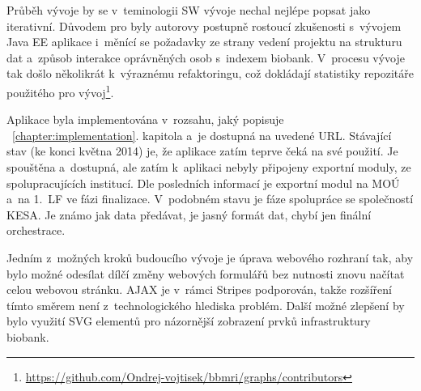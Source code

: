 \documentclass[11pt, draft, oneside]{fithesis2}
\begin{document}
Průběh vývoje by se v~teminologii SW vývoje nechal nejlépe popsat jako iterativní. Důvodem pro  byly autorovy postupně rostoucí zkušenosti s~vývojem Java EE aplikace i~měnící se požadavky ze strany vedení projektu na strukturu dat a~způsob interakce oprávněných osob s~indexem biobank. V~procesu vývoje tak došlo několikrát k~výraznému refaktoringu, což dokládají statistiky repozitáře použitého pro vývoj\footnote{\url{https://github.com/Ondrej-vojtisek/bbmri/graphs/contributors}}.

Aplikace byla implementována v~rozsahu, jaký popisuje ~\ref{chapter:implementation}. kapitola a~je dostupná na uvedené URL. Stávající stav (ke konci května 2014) je, že aplikace zatím teprve čeká na své  použití. Je spouštěna a~dostupná, ale zatím k~aplikaci nebyly připojeny exportní moduly, ze spolupracujících institucí. Dle posledních informací je exportní modul na MOÚ a~na 1.~LF ve fázi finalizace. V~podobném stavu je fáze spolupráce se společností KESA. Je známo jak data předávat, je jasný formát dat, chybí jen finální orchestrace. 

Jedním z~možných kroků budoucího vývoje je úprava webového rozhraní tak, aby bylo možné odesílat dílčí změny webových formulářů bez nutnosti znovu načítat celou webovou stránku. AJAX je v~rámci Stripes podporován, takže rozšíření tímto směrem není z~technologického hlediska problém. Další možné zlepšení by bylo využití SVG elementů pro názornější zobrazení prvků infrastruktury biobank. 




\renewcommand{\UrlBreaks}{\do\/\do\a\do\b\do\c\do\e\do\f\do\i\do\j\do\k\do\l\do\m\do\n\do\o\do\q\do\r\do\s\do\u\do\v\do\w\do\x\do\y\do\z\do\A\do\B\do\C\do\D\do\E\do\F\do\G\do\H\do\I\do\J\do\K\do\L\do\M\do\N\do\O\do\P\do\Q\do\R\do\S\do\T\do\U\do\V\do\W\do\X\do\Y\do\Z\do\?\do\=\do\-\do\0\do\1\do\3\do\4\do\5\do\6\do\7\do\8\do\9\do\p\do\d\do\h}
\mathchardef{}\relax
\end{document}
